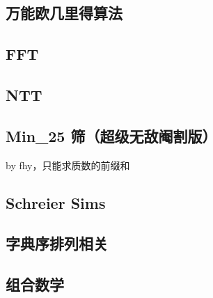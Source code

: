 \documentclass[12pt]{article}
\begin{document}


\newpage

\subsection{万能欧几里得算法}



\newpage

\subsection{FFT}



\newpage

\subsection{NTT}



\newpage


\subsection{Min\_25 筛（超级无敌阉割版）}

by fhy，只能求质数的前缀和



\newpage

\subsection{Schreier Sims}



\subsection{字典序排列相关}



\newpage

\subsection{组合数学}
\end{document}
